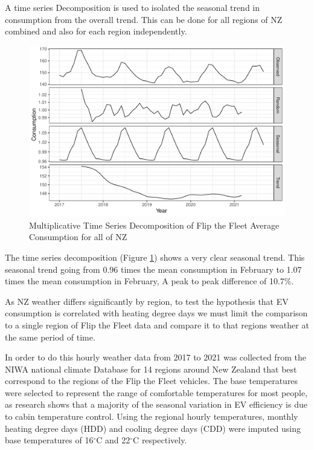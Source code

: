 \documentclass[
]{article}
\begin{document}
A time series Decomposition is used to isolated the seasonal trend in
consumption from the overall trend. This can be done for all regions of
NZ combined and also for each region independently.

\begin{figure}
\centering
\includegraphics{final_report_files/figure-latex/consum_decomp_plot-1.pdf}
\caption{Multiplicative Time Series Decomposition of Flip the Fleet
Average Consumption for all of NZ\label{fig:consum_decomp_plot}}
\end{figure}

The time series decomposition (Figure \ref{fig:consum_decomp_plot})
shows a very clear seasonal trend. This seasonal trend going from 0.96
times the mean consumption in February to 1.07 times the mean
consumption in February, A peak to peak difference of 10.7\%.

As NZ weather differs significantly by region, to test the hypothesis
that EV consumption is correlated with heating degree days we must limit
the comparison to a single region of Flip the Fleet data and compare it
to that regions weather at the same period of time.

In order to do this hourly weather data from 2017 to 2021 was collected
from the NIWA national climate Database for 14 regions around New
Zealand that best correspond to the regions of the Flip the Fleet
vehicles. The base temperatures were selected to represent the range of
comfortable temperatures for most people, as research shows that a
majority of the seasonal variation in EV efficiency is due to cabin
temperature control\cite{ev_range}. Using the regional hourly
temperatures, monthly heating degree days (HDD) and cooling degree days
(CDD) were imputed using base temperatures of 16\(^\circ\)C and
22\(^\circ\)C respectively.
\end{document}
